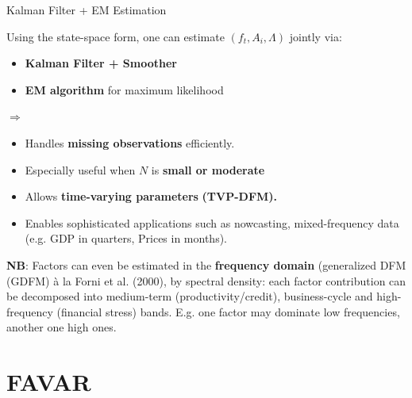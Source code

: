 \documentclass{beamer}
\begin{document}
\begin{frame}{Kalman Filter + EM Estimation}
\small

Using the state-space form, one can estimate $(f_t, A_i, \Lambda)$ jointly via:

\begin{itemize}
  \item \textbf{Kalman Filter + Smoother} \hyperlink{kalman-intuition}{}
  \item \textbf{EM algorithm} for maximum likelihood \hyperlink{em-intuition}{}
\end{itemize}
$\Rightarrow$
\begin{itemize}
  \item Handles \textbf{missing observations} efficiently.
  \item Especially useful when $N$ is \textbf{small or moderate}
  \item Allows \textbf{time-varying parameters} \textbf{(TVP-DFM).}
  \item Enables sophisticated applications such as nowcasting, mixed-frequency data (e.g. GDP in quarters, Prices in months).
\end{itemize}

\medskip
\scriptsize \textbf{NB}: Factors can even be estimated in the \textbf{frequency domain} (generalized DFM (GDFM) à la Forni et al. (2000), by spectral density: each factor contribution can be decomposed into medium-term (productivity/credit), business-cycle and high-frequency (financial stress) bands. E.g. one factor may dominate low frequencies, another one high ones.

\end{frame}





\section{FAVAR}
\end{document}
